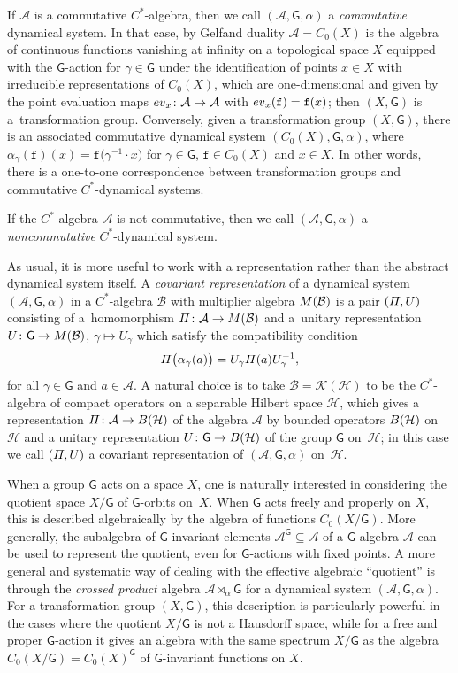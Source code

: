 \documentclass[11pt]{article}
\numberwithin{equation}{section}
\numberwithin{equation}{section}
\newcommand{\CK}{\mathcal{K}}
\newcommand{\sfG}{\mathsf{G}}
\newcommand{\Pim}{{\mit\Pi}}
\def\alg{{\mathcal A}}
\def\balg{{\mathcal B}}
\def\hil{{\mathcal H}}
\begin{document}
If $\alg$ is a commutative $C^*$-algebra, then we call $(\alg,\sfG,\alpha)$ a
\emph{commutative} dynamical system. In that case, by Gelfand duality
$\alg=C_0(X)$ is the algebra of continuous functions vanishing at
infinity on a
topological space $X$
equipped with the $\sfG$-action  for $\gamma\in \sfG$ under
the identification of points $x\in X$ with irreducible representations
of $C_0(X)$, which are one-dimensional and given by the point evaluation
maps ${\rm ev}_x\colon \alg\to\alg$ with ${\rm ev}_x(\mathtt{f})=\mathtt{f}(x)$; then
$(X,\sfG)$ is a~transformation group. Conversely, given a transformation
group $(X,\sfG)$, there is an associated commutative dynamical system
$(C_0(X), \sfG,\alpha)$, where $\alpha_\gamma(\mathtt{f})(x)=\mathtt{f}\big(\gamma^{-1}\cdot x\big)$ for $\gamma\in
\sfG$, $\mathtt{f}\in C_0(X)$ and $x\in X$. In other words, there is a one-to-one
correspondence between transformation groups and commutative $C^*$-dynamical
systems.

If the $C^*$-algebra $\alg$ is not commutative, then we call
$(\alg,\sfG,\alpha)$ a \emph{noncommutative} $C^*$-dynamical system.

As usual, it is more useful to work with a representation rather than the
abstract dynamical system itself. A \emph{covariant representation} of
a dynamical system $(\alg,\sfG,\alpha)$ in a $C^*$-algebra $\balg$ with
multiplier algebra ${\rm M}(\balg)$ is a
pair $(\Pim,U)$ consisting of a~homomorphism $\Pim\colon \alg\to {\rm M}(\balg)$ and a~unitary representation $U\colon \sfG\to{\rm M}(\balg)$, $\gamma\mapsto U_\gamma$ which satisfy the compatibility condition
\[
\Pim\big(\alpha_\gamma(a)\big) = U_\gamma \Pim(a) U_\gamma^{-1} ,
\]
for all $\gamma\in \sfG$ and $a\in\alg$. A natural choice is to take
$\balg=\CK(\hil)$ to be the $C^*$-algebra of compact operators on a
separable Hilbert space $\hil$, which gives a
representation $\Pim\colon \alg\to{\rm B}(\hil)$ of the algebra $\alg$ by
bounded operators ${\rm B}(\hil)$ on $\hil$ and a unitary representation
$U\colon \sfG\to{\rm B}(\hil)$ of the group $\sfG$ on~$\hil$; in this case
we call $(\Pim,U)$ a covariant representation of $(\alg,\sfG,\alpha)$ on~$\hil$.

When a group $\sfG$ acts on a space $X$, one is naturally interested
in considering the
quotient space $X/\sfG$ of $\sfG$-orbits on~$X$. When $\sfG$ acts
freely and properly on
$X$, this is described algebraically by the algebra of functions
$C_0(X/\sfG)$. More generally, the subalgebra of $\sfG$-invariant elements
$\alg^\sfG\subseteq\alg$ of a $\sfG$-algebra $\alg$ can be used to represent the quotient, even for
$\sfG$-actions with fixed points. A more general and systematic way of
dealing with the effective algebraic ``quotient'' is through the
\emph{crossed product} algebra $\alg\rtimes_\alpha \sfG$ for a dynamical
system $(\alg,\sfG,\alpha)$. For a transformation group $(X,\sfG)$,
this description is particularly powerful in the cases where the
quotient $X/\sfG$ is not a Hausdorff space, while for a free and proper
$\sfG$-action it gives an algebra with the same spectrum $X/\sfG$
as the algebra $C_0(X/\sfG)=C_0(X)^\sfG$ of
$\sfG$-invariant functions on $X$.
\end{document}
